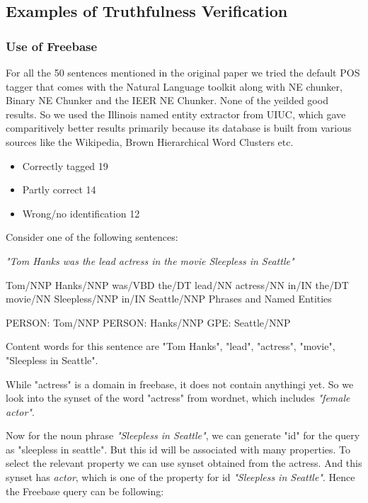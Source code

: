 \documentclass[11pt]{article}
\begin{document}
\subsection{Examples of Truthfulness Verification}


\subsubsection{Use of Freebase}

For all the 50 sentences mentioned in the original paper we tried the default POS tagger that comes with the Natural Language toolkit along with NE chunker, Binary NE Chunker and the IEER NE Chunker. None of the yeilded good results. So we used the Illinois named entity extractor from UIUC, which gave comparitively better results primarily because its database is built from various sources like the Wikipedia, Brown Hierarchical Word Clusters etc. 

\begin{itemize}
\item Correctly tagged 19
\item Partly correct 14	
\item Wrong/no identification 12
\end{itemize}



Consider one of the following sentences:

\emph{"Tom Hanks was the lead actress in the movie Sleepless in Seattle"}

Tom/NNP Hanks/NNP was/VBD the/DT lead/NN actress/NN in/IN the/DT movie/NN Sleepless/NNP in/IN Seattle/NNP
Phrases and Named Entities

PERSON:
    Tom/NNP
PERSON:
    Hanks/NNP
GPE:
    Seattle/NNP

Content words for this sentence are "Tom Hanks", "lead", "actress", "movie", "Sleepless in Seattle". 

While "actress" is a domain in freebase, it does not contain anythingi yet. So we look into the synset of the word "actress" from wordnet, which includes \emph{"female actor"}.

Now for the noun phrase \emph{"Sleepless in Seattle"}, we can generate "id" for the query as "sleepless in seattle". But this id will be associated with many properties. To select the relevant property we can use synset obtained from the actress. And this synset has {\em actor}, which is one of the property for id {\em "Sleepless in Seattle"}. Hence the Freebase query can be following:
\end{document}
